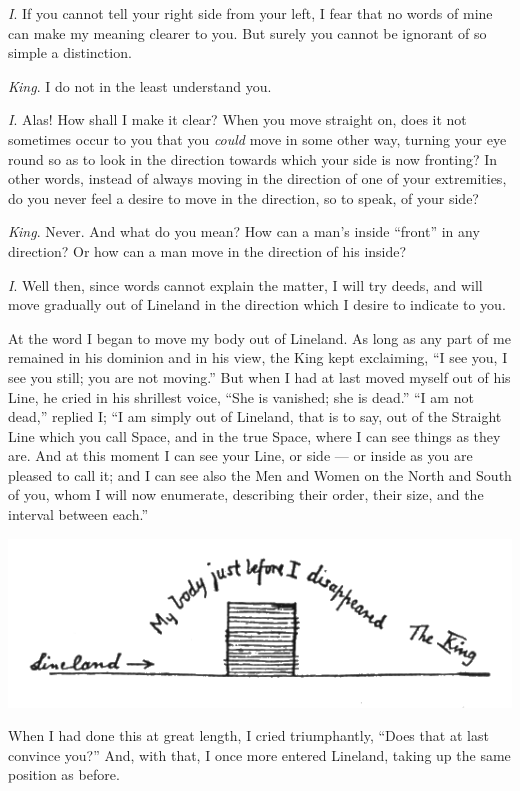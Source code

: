 \documentclass[10pt, kindle, oneside]{kindle}
\begin{document}
\emph{I}. If you cannot tell your right side from your left, I fear that no words of
mine can make my meaning clearer to you. But surely you cannot be ignorant of
so simple a distinction.

\emph{King}. I do not in the least understand you.

\emph{I}. Alas! How shall I make it clear? When you move straight on, does it not
sometimes occur to you that you \emph{could} move in some other way, turning your eye
round so as to look in the direction towards which your side is now fronting?
In other words, instead of always moving in the direction of one of your
extremities, do you never feel a desire to move in the direction, so to speak,
of your side?

\emph{King}. Never. And what do you mean? How can a man's inside ``front'' in any
direction? Or how can a man move in the direction of his inside?

\emph{I}. Well then, since words cannot explain the matter, I will try deeds, and
will move gradually out of Lineland in the direction which I desire to
indicate to you.

At the word I began to move my body out of Lineland. As long as any part of me
remained in his dominion and in his view, the King kept exclaiming, ``I see
you, I see you still; you are not moving.'' But when I had at last moved myself
out of his Line, he cried in his shrillest voice, ``She is vanished; she is
dead.'' ``I am not dead,'' replied I; ``I am simply out of Lineland, that is to
say, out of the Straight Line which you call Space, and in the true Space,
where I can see things as they are. And at this moment I can see your Line, or
side --- or inside as you are pleased to call it; and I can see also the Men and
Women on the North and South of you, whom I will now enumerate, describing
their order, their size, and the interval between each.''

\includegraphics[trim=0mm 0mm 0mm 0mm,width=\linewidth]{fig7}

When I had done this at great length, I cried triumphantly, ``Does that at last
convince you?'' And, with that, I once more entered Lineland, taking up the
same position as before.
\end{document}
